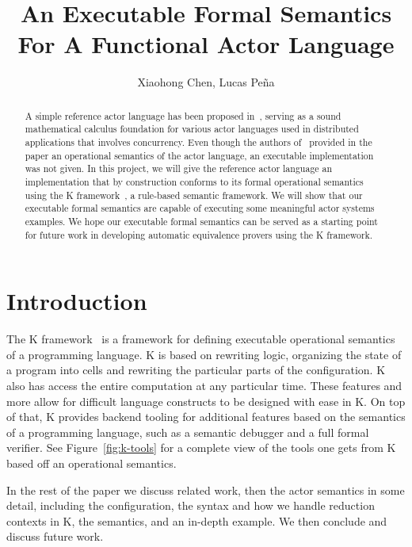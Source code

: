 \documentclass{llncs}
\begin{document}
%
\mainmatter              %
%
\title{An Executable Formal Semantics For A Functional Actor Language}
%
\author{Xiaohong Chen, Lucas Pe\~{n}a}
%

\maketitle              %

\begin{abstract}
A simple reference actor language has been proposed in~\cite{actor}, serving as a
sound mathematical calculus foundation for various actor languages used in
distributed applications that involves concurrency. Even though the authors
of~\cite{actor} provided in the paper an operational semantics of the actor language,
an executable implementation was not given. In this project, we will give the
reference actor language an implementation that by construction conforms to its
formal operational semantics using the K framework~\cite{kframework}, a rule-based
semantic framework. We will show that our executable formal semantics are
capable of executing some meaningful actor systems examples. We hope our
executable formal semantics can be served as a starting point for future work in
developing automatic equivalence provers using the K framework.
\end{abstract}
%
\section{Introduction}
The K framework~\cite{kframework} is a framework for defining executable operational
semantics of a programming language. K is based on rewriting logic, organizing
the state of a program into cells and rewriting the particular parts of the
configuration. K also has access the entire computation at any particular
time. These features and more allow for difficult language constructs to be
designed with ease in K. On top of that, K provides backend tooling for
additional features based on the semantics of a programming language, such as a
semantic debugger and a full formal verifier. See Figure~\ref{fig:k-tools} for a
complete view of the tools one gets from K based off an operational semantics.

In the rest of the paper we discuss related work, then the actor semantics in
some detail, including the configuration, the syntax and how we handle reduction
contexts in K, the semantics, and an in-depth example. We then conclude and
discuss future work.
\end{document}
